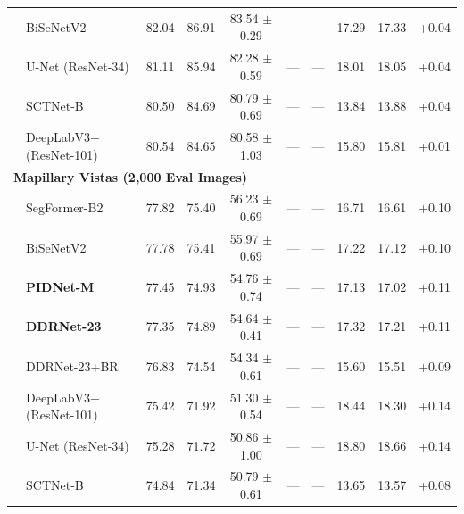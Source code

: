 \begin{table}[t]
{\begin{tabular}{llcccccccc}
  & BiSeNetV2 & 82.04 & 86.91 & 83.54 $\pm$ 0.29 & --- & --- & 17.29 & 17.33 & +0.04 \\
  & U-Net (ResNet-34) & 81.11 & 85.94 & 82.28 $\pm$ 0.59 & --- & --- & 18.01 & 18.05 & +0.04 \\
  & SCTNet-B & 80.50 & 84.69 & 80.79 $\pm$ 0.69 & --- & --- & 13.84 & 13.88 & +0.04 \\
  & DeepLabV3+ (ResNet-101) & 80.54 & 84.65 & 80.58 $\pm$ 1.03 & --- & --- & 15.80 & 15.81 & +0.01 \\
\midrule
\multicolumn{10}{l}{\textbf{Mapillary Vistas (2,000 Eval Images)}} \\
  & SegFormer-B2 & 77.82 & 75.40 & 56.23 $\pm$ 0.69 & --- & --- & 16.71 & 16.61 & +0.10 \\
  & BiSeNetV2 & 77.78 & 75.41 & 55.97 $\pm$ 0.69 & --- & --- & 17.22 & 17.12 & +0.10 \\
  & \textbf{PIDNet-M} & 77.45 & 74.93 & 54.76 $\pm$ 0.74 & --- & --- & 17.13 & 17.02 & +0.11 \\
  & \textbf{DDRNet-23} & 77.35 & 74.89 & 54.64 $\pm$ 0.41 & --- & --- & 17.32 & 17.21 & +0.11 \\
  & DDRNet-23+BR & 76.83 & 74.54 & 54.34 $\pm$ 0.61 & --- & --- & 15.60 & 15.51 & +0.09 \\
  & DeepLabV3+ (ResNet-101) & 75.42 & 71.92 & 51.30 $\pm$ 0.54 & --- & --- & 18.44 & 18.30 & +0.14 \\
  & U-Net (ResNet-34) & 75.28 & 71.72 & 50.86 $\pm$ 1.00 & --- & --- & 18.80 & 18.66 & +0.14 \\
  & SCTNet-B & 74.84 & 71.34 & 50.79 $\pm$ 0.61 & --- & --- & 13.65 & 13.57 & +0.08 \\
\bottomrule
\end{tabular}%
}
\end{table}